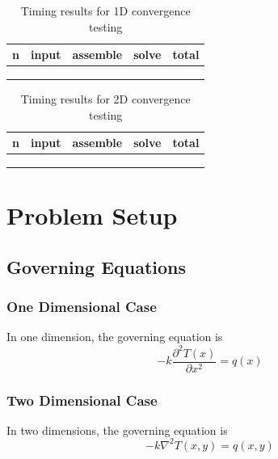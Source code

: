 \documentclass[letterpaper,12pt]{article}
\begin{document}
\begin{table}[h]
\label{tab:1Dtime}
\caption{Timing results for 1D convergence testing}
\begin{center}
\begin{tabular}{| c | c | c | c || c |}
\hline
n &input &assemble &solve & total \\ \hline \hline
 & &  & &\\ \hline
 & &  & &\\ \hline
 & &  & &\\ \hline
\end{tabular}
\end{center}
\end{table}

\begin{table}[h]
\label{tab:2Dtime}
\caption{Timing results for 2D convergence testing}
\begin{center}
\begin{tabular}{| c | c | c | c || c |}
\hline
n &input &assemble &solve & total \\ \hline \hline
 & &  & &\\ \hline
 & &  & &\\ \hline
 & &  & &\\ \hline
\end{tabular}
\end{center}
\end{table}

\section{Problem Setup}
\subsection{Governing Equations}
\subsubsection{One Dimensional Case}
In one dimension, the governing equation is
\begin{equation}
\label{gov1}
-k \frac{\partial^2 T(x)}{\partial x^2} = q(x)
\end{equation}
\subsubsection{Two Dimensional Case}
In two dimensions, the governing equation is
\begin{equation}
\label{gov2}
-k \nabla^2 T(x,y) = q(x,y)
\end{equation}
\end{document}
